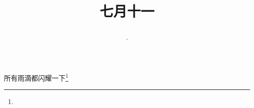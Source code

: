 \title{\date[d=14,m=8,y=2024][year:cn-y,年,month:cn,day:cn,日,·,weekday]·七月十一 }
所有雨滴都闪耀一下\footnote{ }

